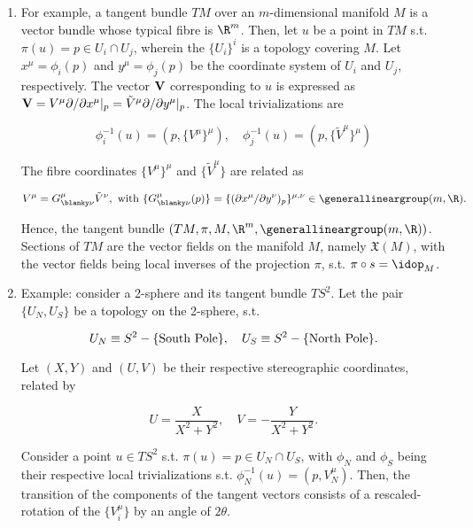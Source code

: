 \begin{enumerate}

    \item For example, a tangent bundle $TM$ over an $m$-dimensional manifold $M$ is a vector bundle whose typical fibre is $\R^m$. 
    Then, let $u$ be a point in $TM$ s.t. $\pi(u) = p \in U_i \cap U_j$, wherein the $\{U_i\}^{i}$ is a topology covering $M$.
    Let $x^\mu = \phi_i (p)$ and $y^{\mu} = \phi_j (p)$ be the coordinate system of $U_i$ and $U_j$, respectively. 
    The vector ${\bf V}$ corresponding to $u$ is expressed as ${\bf V} = V^\mu \partial / \partial x^{\mu} |_p = \tilde{V}^{\mu} \partial / \partial y^{\mu} |_p$.
    The local trivializations are 

    \[
        \phi^{-1}_i (u) = (p, \{V^{\mu}\}^{\mu}), \quad \phi^{-1}_j (u) = (p, \{\tilde{V}^\mu\}^{\mu})
    \]

    The fibre coordinates $\{V^\mu\}^{\mu}$ and $\{\tilde{V}^{\mu}\}$
    are related as 

    \[
        V^\mu = G^{\mu}_{\blanky \nu} \tilde{V}^\nu, \textnormal{ with } \{G^{\mu}_{\blanky \nu} (p)\} = \{(\partial x^\mu / \partial y^\nu)_p\}^{\mu, \nu} \in \generallineargroup(m, \R).
    \]

    Hence, the tangent bundle $(TM, \pi, M, \R^m, \generallineargroup(m, \R))$.
    Sections of $TM$ are the vector fields on the manifold $M$, namely $\mathfrak{X}(M)$, with the vector fields being local inverses of the projection $\pi$, s.t. $\pi \circ s = \idop_{M}$. \\

    \item Example: consider a 2-sphere and its tangent bundle $TS^2$. 
    Let the pair $\{U_N, U_S\}$ be a topology on the 2-sphere, s.t. 

    \[
        U_N \equiv S^2 - \{\textnormal{South Pole}\}, \quad U_S \equiv S^2 - \{\textnormal{North Pole}\}.
    \]

    Let $(X,Y)$ and $(U,V)$ be their respective stereographic coordinates, related by 

    \[
        U = \frac{X}{X^2 + Y^2}, \quad V = - \frac{Y}{X^2 + Y^2}.
    \]

    Consider a point $u \in TS^2$ s.t. $\pi(u) = p \in U_N \cap U_S$, with $\phi_N$ and $\phi_S$ being their respective local trivializations s.t. $\phi_N^{-1} (u) = (p, V_N^{\mu})$. 
    Then, the transition of the components of the tangent vectors consists of a rescaled-rotation of the $\{V_i^\mu\}$ by an angle of $2\theta$.


\end{enumerate}
